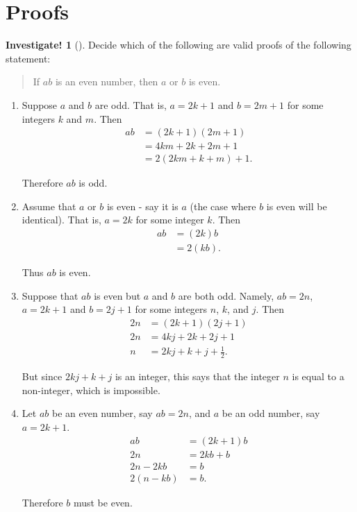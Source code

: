 \documentclass[10pt,]{book}
\theoremstyle{plain}
\theoremstyle{definition}
\theoremstyle{definition}
\theoremstyle{definition}
\newtheorem{investigation}[project]{Investigate!}
\theoremstyle{definition}
\numberwithin{equation}{chapter}
\newcommand{\amp}{&}
\begin{document}
\section[{Proofs}]{Proofs}\label{sec_logic-proofs}
\begin{investigation}[]\label{investigation-15}
\hypertarget{p-2013}{}%
Decide which of the following are valid proofs of the following statement:%
\begin{quote}\hypertarget{blockquote-13}{}
\hypertarget{p-2014}{}%
If \(a b\) is an even number, then \(a\) or \(b\) is even.%
\end{quote}
\hypertarget{p-2015}{}%
%
\begin{enumerate}
\item\hypertarget{li-671}{}\hypertarget{p-2016}{}%
Suppose \(a\) and \(b\) are odd. That is, \(a=2k+1\) and \(b=2m+1\) for some integers \(k\) and \(m\). Then%
\begin{align*}
ab \amp =(2k+1)(2m+1)\\
\amp =4km+2k+2m+1\\
\amp =2(2km+k+m)+1.
\end{align*}
%
\par
\hypertarget{p-2017}{}%
Therefore \(ab\) is odd.%
\item\hypertarget{li-672}{}\hypertarget{p-2018}{}%
Assume that \(a\) or \(b\) is even - say it is \(a\) (the case where \(b\) is even will be identical). That is, \(a=2k\) for some integer \(k\). Then%
\begin{align*}
ab \amp =(2k)b\\
\amp =2(kb).
\end{align*}
%
\par
\hypertarget{p-2019}{}%
Thus \(ab\) is even.%
\item\hypertarget{li-673}{}\hypertarget{p-2020}{}%
Suppose that \(ab\) is even but \(a\) and \(b\) are both odd. Namely, \(ab = 2n\), \(a=2k+1\) and \(b=2j+1\) for some integers \(n\), \(k\), and \(j\). Then%
\begin{align*}
2n \amp =(2k+1)(2j+1)\\
2n \amp =4kj+2k+2j+1\\
n \amp = 2kj+k+j+\frac{1}{2}.
\end{align*}
%
\par
\hypertarget{p-2021}{}%
But since \(2kj+k+j\) is an integer, this says that the integer \(n\) is equal to a non-integer, which is impossible.%
\item\hypertarget{li-674}{}\hypertarget{p-2022}{}%
Let \(ab\) be an even number, say \(ab=2n\), and \(a\) be an odd number, say \(a=2k+1\).%
\begin{align*}
ab \amp =(2k+1)b\\
2n \amp =2kb+b\\
2n-2kb\amp =b\\
2(n-kb)\amp =b.
\end{align*}
%
\par
\hypertarget{p-2023}{}%
Therefore \(b\) must be even.%
\end{enumerate}
%
\end{investigation}
\end{document}
